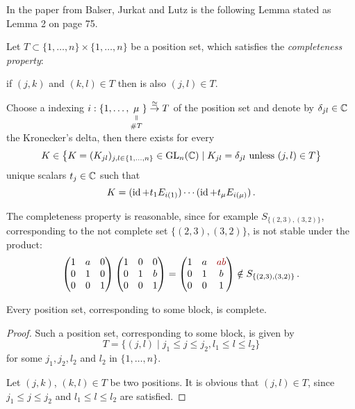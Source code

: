 In the paper \cite{BJL1979Birkhoff} from Balser, Jurkat and Lutz is the
following Lemma stated as Lemma 2 on page 75.
\begin{lem}\label{lem:UniqueDecompositionWotBlocks}
  Let $T\subset\{1,\dots,n\}\times\{1,\dots,n\}$ be a position set, which
  satisfies the \emph{completeness property}:
  \begin{einr}
    if $(j,k)$ and $(k,l)\in T$ then is also $(j,l)\in T$.
  \end{einr}
  Choose a indexing $i:\{1,\dots,
  \underset{\#T}{\underset{\text{\rotatebox[origin=c]{-90}{$=$}}}{\mu}}\}
  \overset{\cong}{\to}T$ of the position set and denote by
  $\delta_{jl}\in\mathbb{C}$ the  Kronecker's delta,
  then there exists for every
  \[
    K\in \left\{K=(K_{jl})_{j,l\in\{1,\dots,n\}}\in\operatorname{GL}_n(\mathbb{C})\mid
      K_{jl}=\delta_{jl} \text{~unless~} (j,l)\in T \right\}
  \]
  unique scalars $t_j\in\mathbb{C}$ such that
  \[
    K=(\operatorname{id} + t_1E_{i(1)})\cdots(\operatorname{id} + t_{\mu}E_{i(\mu)}) \,.
  \]
  \begin{s-rem}
    The completeness property is reasonable, since for example
    $S_{\{(2,3),(3,2)\}}$, corresponding to the not complete set
    $\{(2,3),(3,2)\}$, is not stable under the product:
    \begin{align*}
      \begin{pmatrix}
        1 & a & 0
      \\0 & 1 & 0
      \\0 & 0 & 1
      \end{pmatrix}
      \begin{pmatrix}
        1 & 0 & 0
      \\0 & 1 & b
      \\0 & 0 & 1
      \end{pmatrix}
      =
      \begin{pmatrix}
        1 & a & \textcolor{red!60!black}{ab}
      \\0 & 1 & b
      \\0 & 0 & 1
      \end{pmatrix}
      \notin S_{\{(2,3),(3,2)\}}
      \,.
    \end{align*}
  \end{s-rem}
\end{lem}
\begin{lem}
  Every position set, corresponding to some block, is complete.
\end{lem}
\begin{proof}
  Such a position set, corresponding to some block, is given by
  \[
    T=\{(j,l)\mid j_1\leq j\leq j_2, l_1\leq l\leq l_2\}
  \]
  for some $j_1,j_2,l_2$ and $l_2$ in $\{1,\dots,n\}$.

  Let $(j,k)$, $(k,l)\in T$ be two positions.
  It is obvious that $(j,l)\in T$, since $j_1\leq j\leq j_2$ and
  $l_1\leq l\leq l_2$ are satisfied.
\end{proof}
